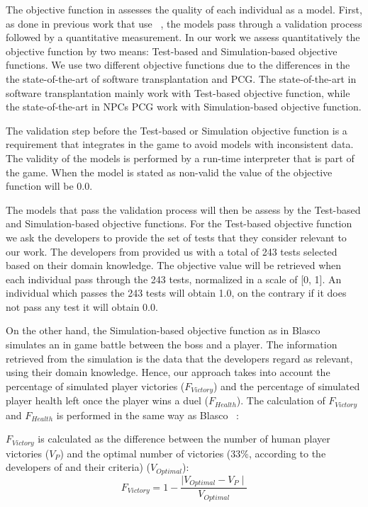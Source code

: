 The objective function in \ApproachName{} assesses the quality of each individual as a model. First, as done in previous work that use \CaseStudy{}~\cite{blasco2021evolutionary}, the models pass through a validation process followed by a quantitative measurement. In our work we assess quantitatively the objective function by two means: Test-based and Simulation-based objective functions. We use two different objective functions due to the differences in the the state-of-the-art of software transplantation and PCG. The state-of-the-art in software transplantation mainly work with Test-based objective function, while the state-of-the-art in NPCs PCG work with Simulation-based objective function.

The validation step before the Test-based or Simulation objective function is a requirement that \CaseStudy{} integrates in the game to avoid models with inconsistent data. The validity of the models is performed by a run-time interpreter that is part of the game. When the model is stated as non-valid the value of the objective function will be 0.0.

The models that pass the validation process will then be assess by the Test-based and Simulation-based objective functions.
For the Test-based objective function we ask the developers to provide the set of tests that they consider relevant to our work. The developers from \CaseStudy{} provided us with a total of 243 tests selected based on their domain knowledge. The objective value will be retrieved when each individual pass through the 243 tests, normalized in a scale of [0, 1]. An individual which passes the 243 tests will obtain 1.0, on the contrary if it does not pass any test it will obtain 0.0.

On the other hand, the Simulation-based objective function as in Blasco \etal~\cite{blasco2021evolutionary} simulates an in game battle between the boss and a player. The information retrieved from the simulation is the data that the developers regard as relevant, using their domain knowledge. Hence, our approach takes into account the percentage of simulated player victories ($F_{Victory}$) and the percentage of simulated player health left once the player wins a duel ($F_{Health}$).
The calculation of $F_{Victory}$ and $F_{Health}$ is performed in the same
way as Blasco \etal~\cite{blasco2021evolutionary}:

$F_{Victory}$ is calculated as the difference between the number of human player victories ($V_{P}$) and the optimal number of victories (33\%, according to the developers of \CaseStudy{} and their criteria) ($V_{Optimal}$):
\begin{equation}
F_{Victory} = 1 -\frac{\mid V_{Optimal} - V_{P} \mid}{ V_{Optimal}}
\end{equation}

